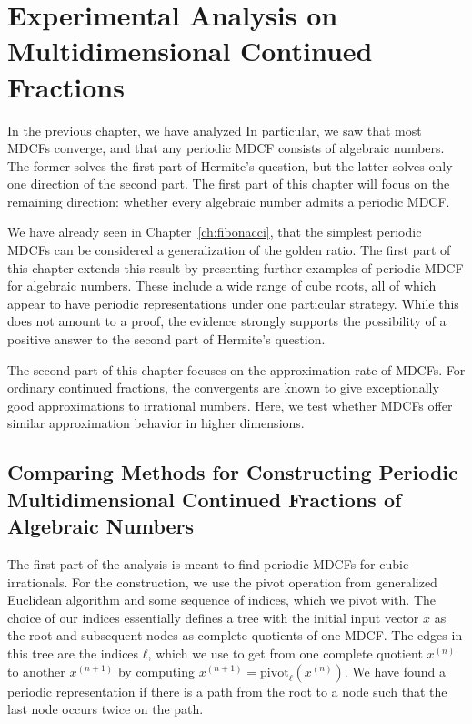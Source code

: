\chapter{Experimental Analysis on Multidimensional Continued Fractions}
\label{ch:implementation}

In the previous chapter, we have analyzed
In particular, we saw that most MDCFs converge,
and that any periodic MDCF consists of algebraic numbers.
The former solves the first part of Hermite's question, but the latter solves
only one direction of the second part.
The first part of this chapter will focus on the remaining direction:
whether every algebraic number admits a periodic MDCF.

We have already seen in Chapter~\ref{ch:fibonacci},
that the simplest periodic MDCFs can be considered a generalization of the
golden ratio.
The first part of this chapter extends this result by presenting further
examples of periodic MDCF for algebraic numbers.
These include a wide range of cube roots,
all of which appear to have periodic representations under one particular strategy.
While this does not amount to a proof, the evidence strongly supports
the possibility of a positive answer to the second part of Hermite’s question.

The second part of this chapter focuses on the approximation rate of MDCFs.
For ordinary continued fractions, the convergents are known to give
exceptionally good approximations to irrational numbers.
Here, we test whether MDCFs offer similar approximation behavior in higher dimensions.

\section{Comparing Methods for Constructing Periodic Multidimensional Continued Fractions of Algebraic Numbers}

The first part of the analysis is meant to find periodic MDCFs for cubic
irrationals.
For the construction, we use the $\mathrm{pivot}$ operation from generalized
Euclidean algorithm and some sequence of indices, which we pivot with.
The choice of our indices essentially defines a tree
with the initial input vector $x$ as the root
and subsequent nodes as complete quotients of one MDCF.
The edges in this tree are the indices $ℓ$, which we use to get from one
complete quotient $x^{(n)}$ to another $x^{(n+1)}$ by computing $x^{(n+1)} =
\mathrm{pivot}_ℓ(x^{(n)})$.
We have found a periodic representation if there is a path from the root to a
node such that the last node occurs twice on the path.

